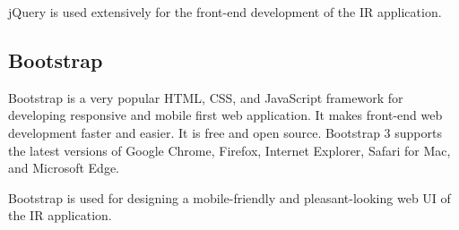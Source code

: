 jQuery is used extensively for the front-end development of the IR application.

\subsection{Bootstrap}
Bootstrap is a very popular HTML, CSS, and JavaScript framework for developing responsive and mobile first web application. It makes front-end web development faster and easier. It is free and open source. Bootstrap 3 supports the latest versions of Google Chrome, Firefox, Internet Explorer, Safari for Mac, and Microsoft Edge.

Bootstrap is used for designing a mobile-friendly and pleasant-looking web UI of the IR application.
